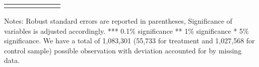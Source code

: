 \begin{sidewaystable}[!htbp]
{\begin{threeparttable}
\begin{tabular}{@{\extracolsep{5pt}}lD{.}{.}{-3} D{.}{.}{-3} D{.}{.}{-3} D{.}{.}{-3} D{.}{.}{-3} D{.}{.}{-3} }
\bottomrule \\[-1.8ex] 

\end{tabular} 

\begin{tablenotes}
  \LARGE
      Notes: Robust standard errors are reported in parentheses, Significance of variables is adjusted accordingly. *** 0.1\% significance ** 1\% significance * 5\% significance. We have a total of 1,083,301 (55,733 for treatment and 1,027,568 for control sample) possible observation with deviation accounted for by missing data.
\end{tablenotes}    



\end{threeparttable}
}
\end{sidewaystable} 